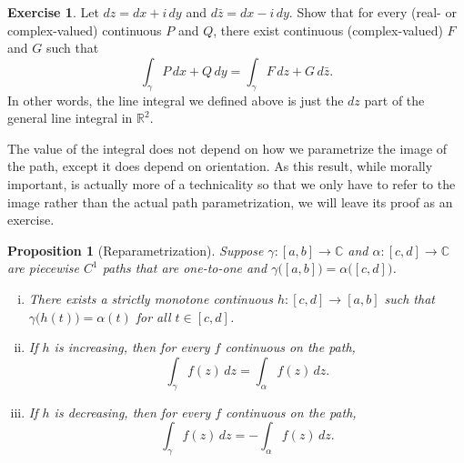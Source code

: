 \documentclass[12pt,openany]{book}
\newcommand{\C}{{\mathbb{C}}}
\newcommand{\R}{{\mathbb{R}}}
\theoremstyle{plain}
\newtheorem{prop}[thm]{Proposition}
\theoremstyle{remark}
\theoremstyle{definition}
\newenvironment{exbox}{%
    \def\FrameCommand{\vrule width 1pt \relax\hspace {10pt}}%
    \MakeFramed {\advance \hsize -\width \FrameRestore }%
}{%
    \endMakeFramed
}
\theoremstyle{exercise}
\newtheorem{exercise}{Exercise}[section]
\theoremstyle{example}
\begin{document}
\begin{exbox}
\begin{exercise}
Let $dz = dx + i \, dy$ and 
$d\bar{z} = dx - i \, dy$.  Show that for every (real- or complex-valued) continuous $P$ and $Q$,
there exist continuous (complex-valued) $F$ and $G$ such that
\begin{equation*}
\int_{\gamma} P \, dx + Q \, dy
=
\int_{\gamma} F \, dz + G \, d\bar{z} .
\end{equation*}
In other words, the line integral we defined above is just the $dz$ part of
the general line integral in $\R^2$.
\end{exercise}
\end{exbox}

The value of the integral does not depend on how we parametrize the image of
the path, except it does depend on orientation.  As this result, while
morally important, is actually more of a technicality so that we only have
to refer to the image rather than the actual path parametrization, we will
leave its proof as an exercise.

\begin{prop}[Reparametrization]
Suppose $\gamma \colon [a,b] \to \C$ and $\alpha \colon [c,d] \to \C$ are
piecewise $C^1$ paths that are one-to-one and
$\gamma\bigl([a,b]\bigr) = \alpha\bigl([c,d]\bigr)$.
\begin{enumerate}[(i)]
\item
There exists a strictly monotone continuous $h \colon [c,d] \to [a,b]$ such
that $\gamma\bigl(h(t)\bigr) = \alpha(t)$ for all $t \in [c,d]$.
\item
If $h$ is increasing, then for every $f$ continuous on the path,
\begin{equation*}
\int_\gamma f(z) \, dz = \int_{\alpha} f(z) \, dz .
\end{equation*}
\item
If $h$ is decreasing, then for every $f$ continuous on the path,
\begin{equation*}
\int_\gamma f(z) \, dz = - \int_{\alpha} f(z) \, dz .
\end{equation*}
\end{enumerate}
\end{prop}
\end{document}
